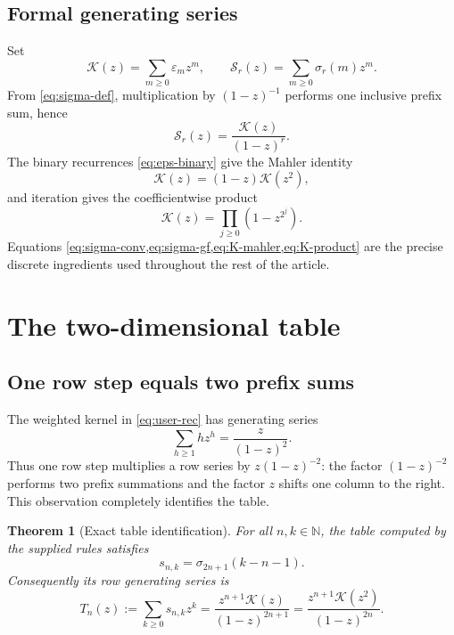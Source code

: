 \documentclass[11pt]{article}
\newtheorem{theorem}{Theorem}[section]
\theoremstyle{definition}
\theoremstyle{remark}
\newcommand{\N}{\mathbb N}
\newcommand{\eps}{\varepsilon}
\newcommand{\K}{\mathcal K}
\newcommand{\Sgen}{\mathcal S}
\begin{document}
\subsection{Formal generating series}

Set
\begin{equation}
 \K(z)=\sum_{m\geq0}\eps_mz^m,
 \qquad
 \Sgen_r(z)=\sum_{m\geq0}\sigma_r(m)z^m.                  \label{eq:series-def}
\end{equation}
From \cref{eq:sigma-def}, multiplication by \((1-z)^{-1}\) performs one
inclusive prefix sum, hence
\begin{equation}
 \Sgen_r(z)=\frac{\K(z)}{(1-z)^r}.                         \label{eq:sigma-gf}
\end{equation}
The binary recurrences \cref{eq:eps-binary} give the Mahler identity
\begin{equation}
 \K(z)=(1-z)\K(z^2),                                      \label{eq:K-mahler}
\end{equation}
and iteration gives the coefficientwise product
\begin{equation}
 \K(z)=\prod_{j\geq0}(1-z^{2^j}).                         \label{eq:K-product}
\end{equation}
Equations \cref{eq:sigma-conv,eq:sigma-gf,eq:K-mahler,eq:K-product} are the
precise discrete ingredients used throughout the rest of the article.

\section{The two-dimensional table}

\subsection{One row step equals two prefix sums}

The weighted kernel in \cref{eq:user-rec} has generating series
\begin{equation}
 \sum_{h\geq1}h z^h=\frac{z}{(1-z)^2}.                     \label{eq:kernel-gf}
\end{equation}
Thus one row step multiplies a row series by \(z(1-z)^{-2}\): the factor
\((1-z)^{-2}\) performs two prefix summations and the factor \(z\) shifts
one column to the right.  This observation completely identifies the table.

\begin{theorem}[Exact table identification]
For all \(n,k\in\N\), the table computed by the supplied rules satisfies
\begin{equation}
 \boxed{s_{n,k}=\sigma_{2n+1}(k-n-1).}                     \label{eq:table-sigma}
\end{equation}
Consequently its row generating series is
\begin{equation}
 T_n(z):=\sum_{k\geq0}s_{n,k}z^k
  =\frac{z^{n+1}\K(z)}{(1-z)^{2n+1}}
  =\frac{z^{n+1}\K(z^2)}{(1-z)^{2n}}.                     \label{eq:row-gf}
\end{equation}
\end{theorem}
\end{document}
